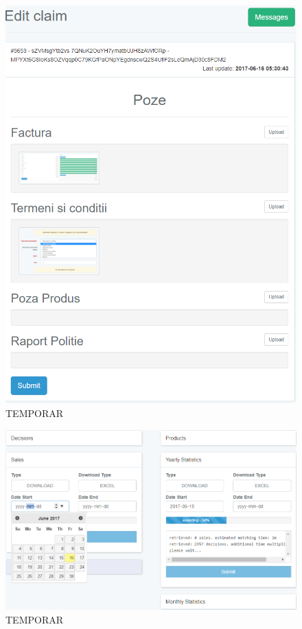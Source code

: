 	\begin{figure}
		\includegraphics[width=\linewidth]{../imagini/report_incarcare_poze.png}
		\caption{TEMPORAR}
		\label{fig:TEMP}
	\end{figure}
	\begin{figure}
		\includegraphics[width=\linewidth]{../imagini/reports.png}
		\caption{TEMPORAR}
		\label{fig:TEMP}
	\end{figure}

